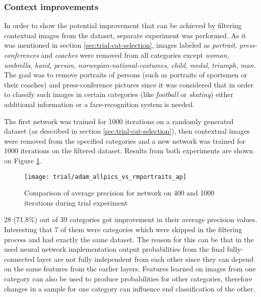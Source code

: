 \subsubsection{Context improvements}
    In order to show the potential improvement that can be achieved by filtering contextual images from the dataset, separate experiment was performed. As it was mentioned in section \ref{sec:trial-cat-selection}, images labeled as \textit{portrait}, \textit{press-conferences} and \textit{coaches} were removed from all categories except \textit{woman}, \textit{umbrella}, \textit{hand}, \textit{person}, \textit{norwegian-national-costumes}, \textit{child}, \textit{medal}, \textit{triumph}, \textit{man}. The goal was to remove portraits of persons (such as portraits of sportsmen or their coaches) and press-conference pictures since it was considered that in order to classify such images in certain categories (like \textit{football} or \textit{skating}) either additional information or a face-recognition system is needed.
    
    The first network was trained for 1000 iterations on a randomly generated dataset (as described in section \ref{sec:trial-cat-selection}), then contextual images were removed from the specified categories and a new network was trained for 1000 iterations on the filtered dataset. Results from both experiments are shown on Figure \ref{fig:trial-allpics-vs-rmportraits}.
    
    \begin{figure}[H]
        \centering
        \texttt{[image: trial/adam\_allpics\_vs\_rmportraits\_ap]}
        \caption{Comparison of average precision for network on 400 and 1000 iterations during trial experiment}
        \label{fig:trial-allpics-vs-rmportraits}
    \end{figure}
    
    28 (71.8\%) out of 39 categories got improvement in their average precision values. Interesting that 7 of them were categories which were skipped in the filtering process and had exactly the same dataset. The reason for this can be that in the used neural network implementation output probabilities from the final fully-connected layer are not fully independent from each other since they can depend on the same features from the earlier layers. Features learned on images from one category can also be used to produce probabilities for other categories, therefore changes in a sample for one category can influence end classification of the other.
    

